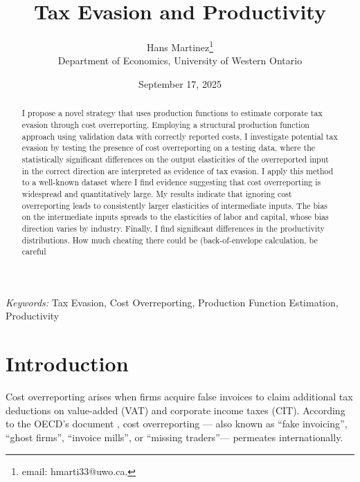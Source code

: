 \documentclass[
  12pt]{article}
\renewcommand*\contentsname{Table of contents}
\newcommand\contentsname{Table of contents}
\theoremstyle{definition}
\theoremstyle{remark}
\begin{document}
\def\spacingset#1{\renewcommand{\baselinestretch}%
{#1}\small\normalsize} \spacingset{1}



\date{September 17, 2025}
\title{\bf Tax Evasion and Productivity}
\author{
Hans Martinez\thanks{email: hmarti33@uwo.ca.}\\
Department of Economics, University of Western Ontario\\
}
\maketitle

\bigskip
\bigskip
\begin{abstract}
I propose a novel strategy that uses production functions to estimate
corporate tax evasion through cost overreporting. Employing a structural
production function approach using validation data with correctly
reported costs, I investigate potential tax evasion by testing the
presence of cost overreporting on a testing data, where the
statistically significant differences on the output elasticities of the
overreported input in the correct direction are interpreted as evidence
of tax evasion. I apply this method to a well-known dataset where I find
evidence suggesting that cost overreporting is widespread and
quantitatively large. My results indicate that ignoring cost
overreporting leads to consistently larger elasticities of intermediate
inputs. The bias on the intermediate inputs spreads to the elasticities
of labor and capital, whose bias direction varies by industry. Finally,
I find significant differences in the productivity distributions. How
much cheating there could be (back-of-envelope calculation, be careful
\end{abstract}

\noindent%
{\it Keywords:} Tax Evasion, Cost Overreporting, Production Function
Estimation, Productivity
\vfill

\newpage
\spacingset{1.9} %

\renewcommand*\contentsname{Table of contents}
{
\hypersetup{linkcolor=}
\setcounter{tocdepth}{3}
\tableofcontents
}
\section*{Introduction}\label{introduction}

Cost overreporting arises when firms acquire false invoices to claim
additional tax deductions on value-added (VAT) and corporate income
taxes (CIT). According to the OECD's document \citet{OECD2017}, cost
overreporting --- also known as ``fake invoicing'', ``ghost firms'',
``invoice mills'', or ``missing traders''--- permeates internationally.
\end{document}
